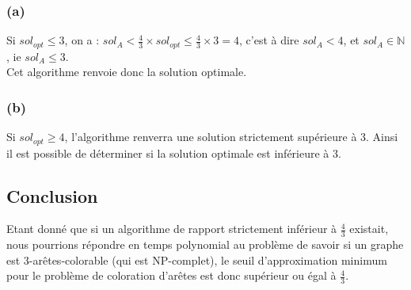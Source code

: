 \subsubsection{(a)}\label{ex11_q2_a}
Si $sol_{opt} \leq 3$, on a : $sol_A < \frac{4}{3} \times sol_{opt} \leq \frac{4}{3}
\times 3 = 4$,
c'est à dire $sol_A < 4$, et $sol_A \in \mathbb{N}$, ie $sol_A \leq 3$.\\
Cet algorithme renvoie donc la solution optimale.

\subsubsection{(b)}\label{ex11_q2_b}
Si $sol_{opt} \geq 4$, l'algorithme renverra une solution strictement supérieure à 3.
Ainsi il est possible de déterminer si la solution optimale est inférieure à 3.

\subsection{Conclusion}\label{ex11_q3}
Etant donné que si un algorithme de rapport strictement inférieur à $\frac{4}{3}$
existait, nous pourrions répondre en temps polynomial au problème de savoir si un graphe est
3-arêtes-colorable (qui est NP-complet),
le seuil d'approximation minimum pour le problème de coloration d'arêtes est donc
supérieur ou égal à $\frac{4}{3}$.

